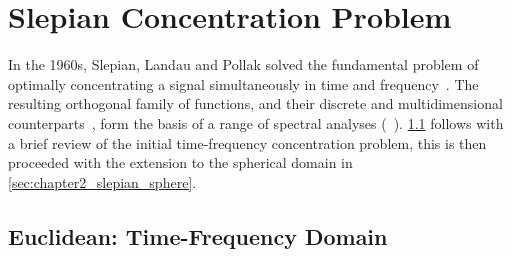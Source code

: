 

\section{Slepian Concentration Problem}\label{sec:chapter2_slepian_concentration_problem}

In the 1960s, Slepian, Landau and Pollak solved the fundamental problem of optimally concentrating a signal simultaneously in time and frequency~\cite{Landau1961,Landau1962,Slepian1983,Slepian1961}.
The resulting orthogonal family of functions, and their discrete and multidimensional counterparts~\cite{Bronez1988,Hanssen1997,Liu1992,Slepian1964,Slepian1978}, form the basis of a range of spectral analyses (\eg{}~\cite{Thomson1982,Thomson1990}).
\cref{sec:chapter2_slepian_euclidean} follows with a brief review of the initial time-frequency concentration problem, this is then proceeded with the extension to the spherical domain in \cref{sec:chapter2_slepian_sphere}.

\subsection{Euclidean: Time-Frequency Domain}\label{sec:chapter2_slepian_euclidean}

